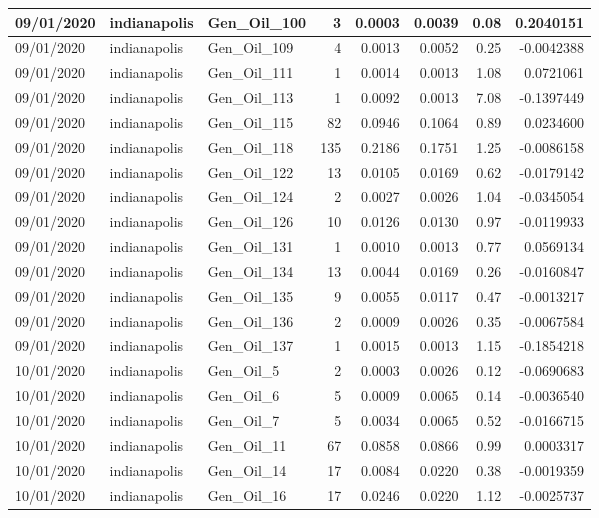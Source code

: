 \documentclass[
  letterpaper,
  DIV=11,
  numbers=noendperiod]{scrartcl}
\begin{document}
\begin{tabular}{l|l|l|r|r|r|r|r}
\hline
09/01/2020 & indianapolis & Gen\_Oil\_100 & 3 & 0.0003 & 0.0039 & 0.08 & 0.2040151\\
\hline
09/01/2020 & indianapolis & Gen\_Oil\_109 & 4 & 0.0013 & 0.0052 & 0.25 & -0.0042388\\
\hline
09/01/2020 & indianapolis & Gen\_Oil\_111 & 1 & 0.0014 & 0.0013 & 1.08 & 0.0721061\\
\hline
09/01/2020 & indianapolis & Gen\_Oil\_113 & 1 & 0.0092 & 0.0013 & 7.08 & -0.1397449\\
\hline
09/01/2020 & indianapolis & Gen\_Oil\_115 & 82 & 0.0946 & 0.1064 & 0.89 & 0.0234600\\
\hline
09/01/2020 & indianapolis & Gen\_Oil\_118 & 135 & 0.2186 & 0.1751 & 1.25 & -0.0086158\\
\hline
09/01/2020 & indianapolis & Gen\_Oil\_122 & 13 & 0.0105 & 0.0169 & 0.62 & -0.0179142\\
\hline
09/01/2020 & indianapolis & Gen\_Oil\_124 & 2 & 0.0027 & 0.0026 & 1.04 & -0.0345054\\
\hline
09/01/2020 & indianapolis & Gen\_Oil\_126 & 10 & 0.0126 & 0.0130 & 0.97 & -0.0119933\\
\hline
09/01/2020 & indianapolis & Gen\_Oil\_131 & 1 & 0.0010 & 0.0013 & 0.77 & 0.0569134\\
\hline
09/01/2020 & indianapolis & Gen\_Oil\_134 & 13 & 0.0044 & 0.0169 & 0.26 & -0.0160847\\
\hline
09/01/2020 & indianapolis & Gen\_Oil\_135 & 9 & 0.0055 & 0.0117 & 0.47 & -0.0013217\\
\hline
09/01/2020 & indianapolis & Gen\_Oil\_136 & 2 & 0.0009 & 0.0026 & 0.35 & -0.0067584\\
\hline
09/01/2020 & indianapolis & Gen\_Oil\_137 & 1 & 0.0015 & 0.0013 & 1.15 & -0.1854218\\
\hline
10/01/2020 & indianapolis & Gen\_Oil\_5 & 2 & 0.0003 & 0.0026 & 0.12 & -0.0690683\\
\hline
10/01/2020 & indianapolis & Gen\_Oil\_6 & 5 & 0.0009 & 0.0065 & 0.14 & -0.0036540\\
\hline
10/01/2020 & indianapolis & Gen\_Oil\_7 & 5 & 0.0034 & 0.0065 & 0.52 & -0.0166715\\
\hline
10/01/2020 & indianapolis & Gen\_Oil\_11 & 67 & 0.0858 & 0.0866 & 0.99 & 0.0003317\\
\hline
10/01/2020 & indianapolis & Gen\_Oil\_14 & 17 & 0.0084 & 0.0220 & 0.38 & -0.0019359\\
\hline
10/01/2020 & indianapolis & Gen\_Oil\_16 & 17 & 0.0246 & 0.0220 & 1.12 & -0.0025737\\

\end{tabular}
\end{document}
